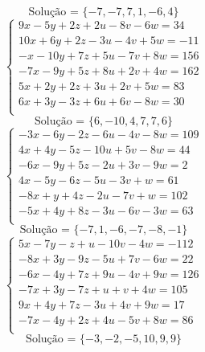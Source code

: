 \documentclass[12pt,oneside,a4paper]{article}
\begin{document}
\begin{equation*}
\text{Solução = }\{-7,-7,7,1,-6,4\}
\end{equation*}
\vspace{\baselineskip}
\begin{equation*}
\begin{cases}
9x-5y+2z+2u-8v-6w=34 \\
10x+6y+2z-3u-4v+5w=-11 \\
-x-10y+7z+5u-7v+8w=156 \\
-7x-9y+5z+8u+2v+4w=162 \\
5x+2y+2z+3u+2v+5w=83 \\
6x+3y-3z+6u+6v-8w=30 \\
\end{cases}
\end{equation*}
\begin{equation*}
\text{Solução = }\{6,-10,4,7,7,6\}
\end{equation*}
\vspace{\baselineskip}
\begin{equation*}
\begin{cases}
-3x-6y-2z-6u-4v-8w=109 \\
4x+4y-5z-10u+5v-8w=44 \\
-6x-9y+5z-2u+3v-9w=2 \\
4x-5y-6z-5u-3v+w=61 \\
-8x+y+4z-2u-7v+w=102 \\
-5x+4y+8z-3u-6v-3w=63 \\
\end{cases}
\end{equation*}
\begin{equation*}
\text{Solução = }\{-7,1,-6,-7,-8,-1\}
\end{equation*}
\vspace{\baselineskip}
\begin{equation*}
\begin{cases}
5x-7y-z+u-10v-4w=-112 \\
-8x+3y-9z-5u+7v-6w=22 \\
-6x-4y+7z+9u-4v+9w=126 \\
-7x+3y-7z+u+v+4w=105 \\
9x+4y+7z-3u+4v+9w=17 \\
-7x-4y+2z+4u-5v+8w=86 \\
\end{cases}
\end{equation*}
\begin{equation*}
\text{Solução = }\{-3,-2,-5,10,9,9\}
\end{equation*}
\end{document}
